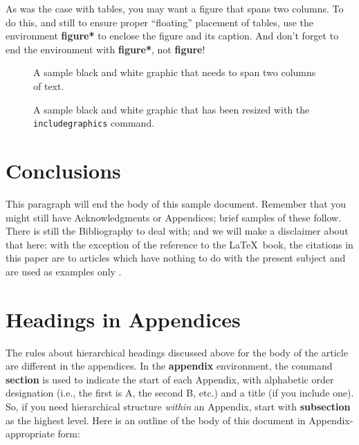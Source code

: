 \documentclass[sigconf]{acmart}
\begin{document}
As was the case with tables, you may want a figure that spans two
columns.  To do this, and still to ensure proper ``floating''
placement of tables, use the environment \textbf{figure*} to enclose
the figure and its caption.  And don't forget to end the environment
with \textbf{figure*}, not \textbf{figure}!

\begin{figure*}
\caption{A sample black and white graphic
that needs to span two columns of text.}
\end{figure*}


\begin{figure}
\caption{A sample black and white graphic that has
been resized with the \texttt{includegraphics} command.}
\end{figure}



\section{Conclusions}

This paragraph will end the body of this sample document.  Remember
that you might still have Acknowledgments or Appendices; brief samples
of these follow.  There is still the Bibliography to deal with; and we
will make a disclaimer about that here: with the exception of the
reference to the \LaTeX\ book, the citations in this paper are to
articles which have nothing to do with the present subject and are
used as examples only \cite{Paul2014}.



\appendix

\section{Headings in Appendices}

The rules about hierarchical headings discussed above for the body of
the article are different in the appendices.  In the \textbf{appendix}
environment, the command \textbf{section} is used to indicate the
start of each Appendix, with alphabetic order designation (i.e., the
first is A, the second B, etc.) and a title (if you include one).  So,
if you need hierarchical structure \textit{within} an Appendix, start
with \textbf{subsection} as the highest level. Here is an outline of
the body of this document in Appendix-appropriate form:
\end{document}
